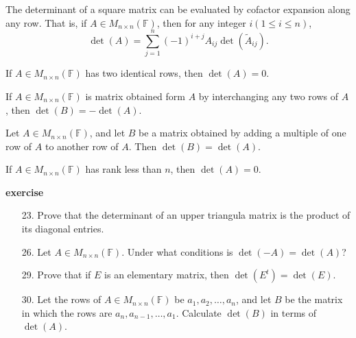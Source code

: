 \newpage
\begin{theorem}
    The determinant of a square matrix can be evaluated by cofactor expansion along any row. That is, if \( A \in M_{n \times n}(\mathbb{F}) \), then for any integer \( i(1 \leq i \leq n ) \),
    \[
    \det (A) = \sum_{j=1}^{n} (-1)^{i+j} A_{ij} \det (\tilde{A}_{ij}).
    \]
\end{theorem}
\vspace{3cm}
\begin{corollary}
    If \( A \in M_{n \times n}(\mathbb{F}) \) has two identical rows, then \(\det (A) = 0\).
\end{corollary}
\vspace{5cm}
\begin{theorem}
    If \( A \in M_{n \times n}(\mathbb{F}) \) is matrix obtained form \(A\) by interchanging any two rows of \(A\), then \(\det (B) = - \det (A)\).
\end{theorem}
\newpage
\begin{theorem}
    Let \( A \in M_{n \times n}(\mathbb{F}) \), and let \( B \) be a matrix obtained by adding a multiple of one row of \(A\) to another row of \(A\). Then \(\det (B) = \det (A)\).
\end{theorem}
\vspace{3cm}
\begin{corollary}
    If \( A \in M_{n \times n}(\mathbb{F}) \) has rank less than \(n\), then \(\det (A) = 0\).
\end{corollary}
\vspace{3cm}
\textbf{exercise}
\begin{enumerate}
    \item[23.] Prove that the determinant of an upper triangula matrix is the product of its diagonal entries. \vspace{3cm}
    \item[26.] Let \(A \in M_{n \times n}(\mathbb{F})\). Under what conditions is \(\det(-A) = \det(A)\)? \vspace{3cm}
    \item[29.] Prove that if \(E\) is an elementary matrix, then \(\det(E^t) = \det(E)\). \vspace{3cm}
    \item[30.] Let the rows of \(A \in M_{n \times n}(\mathbb{F})\) be \(a_1, a_2, \dots , a_n\), and let \(B\) be the matrix in which the rows are \(a_n, a_{n-1}, \dots , a_1\). Calculate \(\det(B)\) in terms of \(\det(A)\).
\end{enumerate}
\vspace{3cm}
